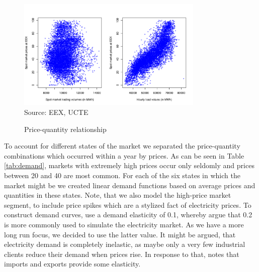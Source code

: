 \begin{figure}[htb]
  \centering
\caption{Price-quantity relationship}
  \includegraphics[width=3.5in]{germandata/pricequant.pdf}
  \label{fig:pricequant}
\\
 \scriptsize Source: EEX, UCTE
\end{figure}

To account for different states of the market we separated the price-quantity combinations which occurred within a year by prices. As can be seen in Table \ref{tab:demand}, markets with extremely high prices occur only seldomly and prices between 20 and 40 are most common. For each of the six states in which the market might be we created linear demand functions based on average prices and quantities in these states. Note, that we also model the high-price market segment, to include price spikes which are a stylized fact of electricity prices.  To construct demand curves, \cite{Neuhoff2005} use a demand elasticity of 0.1, whereby \cite{Genc2007} argue that 0.2 is more commonly used to simulate the electricity market. As we have a more long run focus, we decided to use the latter value. It might be argued, that electricity demand is completely inelastic, as maybe only a very few industrial clients reduce their demand when prices rise. In response to that, \cite{Bushnell2003} notes that imports and exports provide some elasticity.

